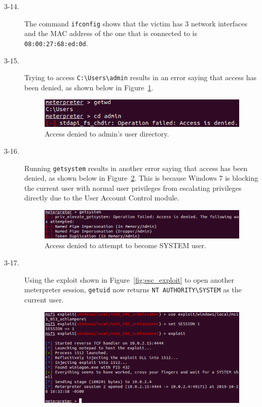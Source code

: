 \documentclass[11pt]{article}
\begin{document}
\begin{description}
  \item[3-14.] The command \verb|ifconfig| shows that the victim has 3 network interfaces and the MAC address of the one that is
    connected to is \\\verb|08:00:27:68:ed:0d|.
  \item[3-15.] Trying to access \verb|C:\Users\admin| results in an error saying that access has been denied, as shown below in
    Figure~\ref{fig:admin_dir}.
    \begin{figure}[htbp]
      \centering
      \includegraphics[width=1\linewidth]{admin_dir.png}
      \caption{Access denied to admin's user directory.}
      \label{fig:admin_dir}
    \end{figure}
  \item[3-16.] Running \verb|getsystem| results in another error saying that access has been denied, as shown below in
    Figure~\ref{fig:getsystem}. This is because Windows 7 is blocking the current user with normal user privileges from
    escalating privileges directly due to the User Account Control module.
    \begin{figure}[htbp]
      \centering
      \includegraphics[width=1\linewidth]{./getsystem.png}
      \caption{Access denied to attempt to become SYSTEM user.}
      \label{fig:getsystem}
    \end{figure}
  \item[3-17.] Using the exploit shown in Figure~\ref{fig:esc_exploit} to open another meterpreter session, \verb|getuid| now
    returns \verb|NT AUTHORITY\SYSTEM| as the current user.
    \begin{figure}[htbp]
      \centering
      \includegraphics[width=1\linewidth]{./exploit.png}

\end{figure}
\end{description}
\end{document}
